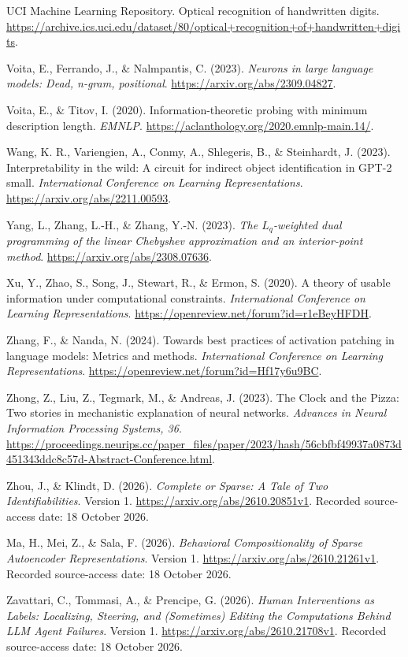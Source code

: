 \documentclass[
  british,
  11pt,
  a4paper,
]{article}
\begin{document}
UCI Machine Learning Repository. Optical recognition of handwritten
digits.
\url{https://archive.ics.uci.edu/dataset/80/optical+recognition+of+handwritten+digits}.

Voita, E., Ferrando, J., \& Nalmpantis, C. (2023). \emph{Neurons in
large language models: Dead, n-gram, positional}.
\url{https://arxiv.org/abs/2309.04827}.

Voita, E., \& Titov, I. (2020). Information-theoretic probing with
minimum description length. \emph{EMNLP}.
\url{https://aclanthology.org/2020.emnlp-main.14/}.

Wang, K. R., Variengien, A., Conmy, A., Shlegeris, B., \& Steinhardt, J.
(2023). Interpretability in the wild: A circuit for indirect object
identification in GPT-2 small. \emph{International Conference on
Learning Representations}. \url{https://arxiv.org/abs/2211.00593}.

Yang, L., Zhang, L.-H., \& Zhang, Y.-N. (2023). \emph{The
\(L_q\)-weighted dual programming of the linear Chebyshev approximation
and an interior-point method}. \url{https://arxiv.org/abs/2308.07636}.

Xu, Y., Zhao, S., Song, J., Stewart, R., \& Ermon, S. (2020). A theory
of usable information under computational constraints.
\emph{International Conference on Learning Representations}.
\url{https://openreview.net/forum?id=r1eBeyHFDH}.

Zhang, F., \& Nanda, N. (2024). Towards best practices of activation
patching in language models: Metrics and methods. \emph{International
Conference on Learning Representations}.
\url{https://openreview.net/forum?id=Hf17y6u9BC}.

Zhong, Z., Liu, Z., Tegmark, M., \& Andreas, J. (2023). The Clock and
the Pizza: Two stories in mechanistic explanation of neural networks.
\emph{Advances in Neural Information Processing Systems, 36}.
\url{https://proceedings.neurips.cc/paper_files/paper/2023/hash/56cbfbf49937a0873d451343ddc8c57d-Abstract-Conference.html}.

Zhou, J., \& Klindt, D. (2026). \emph{Complete or Sparse: A Tale of Two
Identifiabilities}. Version 1. \url{https://arxiv.org/abs/2610.20851v1}.
Recorded source-access date: 18 October 2026.

Ma, H., Mei, Z., \& Sala, F. (2026). \emph{Behavioral Compositionality
of Sparse Autoencoder Representations}. Version 1.
\url{https://arxiv.org/abs/2610.21261v1}. Recorded source-access date:
18 October 2026.

Zavattari, C., Tommasi, A., \& Prencipe, G. (2026). \emph{Human
Interventions as Labels: Localizing, Steering, and (Sometimes) Editing
the Computations Behind LLM Agent Failures}. Version 1.
\url{https://arxiv.org/abs/2610.21708v1}. Recorded source-access date:
18 October 2026.
\end{document}
